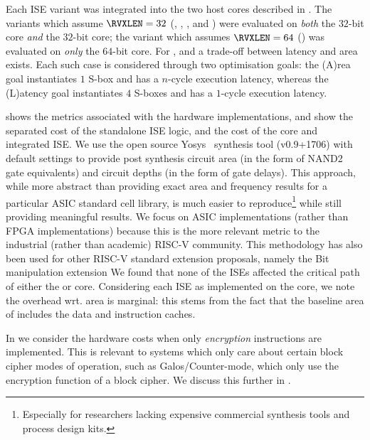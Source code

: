 
Each ISE variant was integrated into the two host cores 
described in .
The variants which assume  $\RVXLEN = 32$
(, , , and ) 
were evaluated
on {\em both} the
$32$-bit  core
{\em  and} the
$32$-bit  core;
the variant  which assumes $\RVXLEN = 64$
()
was  evaluated
on {\em only} the
$64$-bit  core.
For ,  and  a trade-off
between latency and area exists. 
Each such case is considered through two optimisation goals:
the (A)rea    goal
instantiates $1$ S-box   and has a $n$-cycle execution latency,
whereas
the (L)atency goal
instantiates $4$ S-boxes and has a $1$-cycle execution latency.

shows the metrics associated with the hardware implementations, 
and show the separated cost of the standalone ISE logic, and the
cost of the core and integrated ISE.
We use the open source Yosys~\cite{yosys} synthesis tool (v0.9+1706)
with default settings
to provide post synthesis circuit area (in the form of NAND2 gate
equivalents) and circuit depths (in the form of gate delays).
This approach, while more abstract than providing exact area and
frequency results for a particular ASIC standard cell library, is
much easier to reproduce\footnote{
Especially
for researchers lacking expensive commercial
synthesis tools and process design kits.
} while still providing meaningful results.
We focus on ASIC implementations (rather than FPGA implementations)
because this is the more relevant metric to the industrial (rather than
academic) RISC-V community.
This methodology has also been used for other RISC-V standard extension
proposals, namely the Bit manipulation extension
\cite[Section 3.1, Page 54]{riscv:bitmanip:draft}
We found 
that none of the ISEs affected the critical path of either the  
or  core.
Considering each ISE as implemented on the  core, we note the 
overhead wrt. area is marginal: this stems from the fact that the 
baseline area of  includes the data and instruction caches.

In
we consider the hardware costs when only {\em encryption} instructions are
implemented.
This is relevant to systems which only care about certain block cipher
modes of operation, such as Galos/Counter-mode,
which only use the encryption function of a block cipher.
We discuss this further in .

